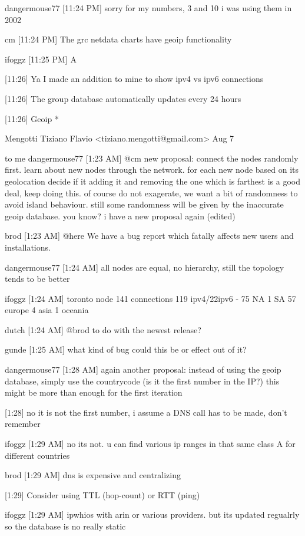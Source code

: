 {dangermouse77 [11:24 PM] 
sorry for my numbers, 3 and 10 i was using them in 2002


cm 
[11:24 PM] 
The grc netdata charts have geoip functionality


ifoggz
[11:25 PM] 
A


[11:26] 
Ya I made an addition to mine to show ipv4 vs ipv6 connections


[11:26] 
The group database automatically updates every 24 hours


[11:26] 
Geoip *

Mengotti Tiziano Flavio <tiziano.mengotti@gmail.com>
Aug 7

to me 
dangermouse77 [1:23 AM] 
@cm new proposal: connect the nodes randomly first. learn about new nodes through the network. for each new node based on its geolocation decide if it adding it and removing the one which is farthest is a good deal, keep doing this. of course do not exagerate, we want a bit of randomness to avoid island behaviour. still some randomness will be given by the inaccurate geoip database. you know? i have a new proposal again (edited)


brod [1:23 AM] 
@here We have a bug report which fatally affects new users and installations.


dangermouse77 [1:24 AM] 
all nodes are equal, no hierarchy, still the topology tends to be better


ifoggz
[1:24 AM] 
toronto node 141 connections 119 ipv4/22ipv6 - 75 NA 1 SA 57 europe 4 asia 1 oceania


dutch
[1:24 AM] 
@brod to do with the newest release?


gunde [1:25 AM] 
what kind of bug could this be or effect out of it?


dangermouse77 [1:28 AM] 
again another proposal: instead of using the geoip database, simply use the countrycode (is it the first number in the IP?) this might be more than enough for the first iteration


[1:28] 
no it is not the first number, i assume a DNS call has to be made, don't remember


ifoggz
[1:29 AM] 
no its not. u can find various ip ranges in that same class A for different countries


brod
[1:29 AM] 
dns is expensive and centralizing


[1:29] 
Consider using TTL (hop-count) or RTT (ping)


ifoggz
[1:29 AM] 
ipwhios with arin or various providers. but its updated regualrly so the database is no really static


}
